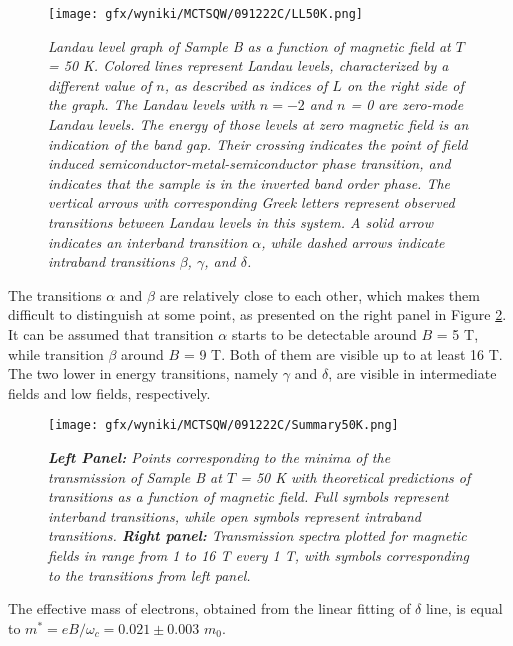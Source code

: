 \documentclass[titlepage,a4paper]{book}
\begin{document}
\begin{figure}[ht]
	\centering
	\texttt{[image: gfx/wyniki/MCTSQW/091222C/LL50K.png]}
	\vspace{-10pt}
	\caption{\textit{Landau level graph of Sample B as a function of magnetic field at $T$ = 50 K. Colored lines represent Landau levels, characterized by a different value of $n$, as described as indices of $L$ on the right side of the graph. The Landau levels with $n = -2$ and $n$ = 0 are zero-mode Landau levels. The energy of those levels at zero magnetic field is an indication of the band gap. Their crossing indicates the point of field induced semiconductor-metal-semiconductor phase transition, and indicates that the sample is in the inverted band order phase. The vertical arrows with corresponding Greek letters represent observed transitions between Landau levels in this system. A solid arrow indicates an interband transition $\alpha$, while dashed arrows indicate intraband transitions $\beta$, $\gamma$, and $\delta$.}}
	\label{fig:LL_SQW_50K}
\end{figure}

The transitions $\alpha$ and $\beta$ are relatively close to each other, which makes them difficult to distinguish at some point, as presented on the right panel in Figure \ref{fig:Summary_SQW_50K}. It can be assumed that transition $\alpha$ starts to be detectable around $B$ = 5 T, while transition $\beta$ around $B$ = 9 T. Both of them are visible up to at least 16 T. The two lower in energy transitions, namely $\gamma$ and $\delta$, are visible in intermediate fields and low fields, respectively.
\begin{figure}[ht]
	\centering
	\texttt{[image: gfx/wyniki/MCTSQW/091222C/Summary50K.png]}
	\vspace{-10pt}
	\caption{\textit{\textbf{Left Panel:} Points corresponding to the minima of the transmission of Sample B at $T$ = 50 K with theoretical predictions of transitions as a function of magnetic field. Full symbols represent interband transitions, while open symbols represent intraband transitions. \textbf{Right panel:} Transmission spectra plotted for magnetic fields in range from 1 to 16 T every 1 T, with symbols corresponding to the transitions from left panel.}}
	\label{fig:Summary_SQW_50K}
\end{figure}

The effective mass of electrons, obtained from the linear fitting of $\delta$ line, is equal to $m^* = eB/\omega_c = 0.021 \pm 0.003$ $m_0$.
\end{document}
